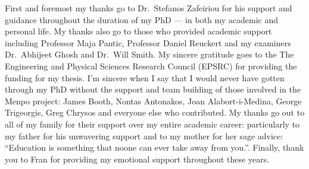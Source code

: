 \begin{acknowledgements}
First and foremost my thanks go to Dr.\ Stefanos Zafeiriou for his support
and guidance throughout the duration of my PhD --- in both my academic and
personal life. My thanks also go to those who provided academic support
including Professor Maja Pantic, Professor Daniel Reuckert and my examiners
Dr.\ Abhijeet Ghosh and Dr.\ Will Smith. My sincere gratitude goes to the
The Engineering and Physical Sciences Research Council (EPSRC) for providing
the funding for my thesis.
I'm sincere when I say that I would never
have gotten through my PhD without the support and team building of those
involved in the Menpo project: James Booth, Nontas Antonakos,
Joan Alabort-i-Medina, George Trigeorgis, Greg Chrysos and everyone else who
contributed. My thanks go out to all of my family for their support
over my entire academic career: particularly to my father for his unwavering support
and to my mother for her sage advice:
``Education is something that noone can ever take away from you.''.
Finally, thank you to Fran for providing my emotional support throughout
these years.
\end{acknowledgements}
